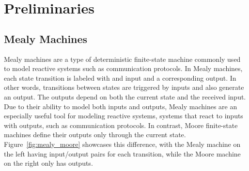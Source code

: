 %
%
% 

\chapter{Preliminaries}

\label{chap:Preliminaries}

\section{Mealy Machines}
Mealy machines are a type of deterministic finite-state machine commonly used to model reactive systems such as communication protocols. In Mealy machines, each state transition is labeled with and input and a corresponding output. In other words, transitions between states are triggered by inputs and also generate an output. The outputs depend on both the current state and the received input. Due to their ability to model both inputs and outputs, Mealy machines are an especially useful tool for modeling reactive systems, systems that react to inputs with outputs, such as communication protocols. In contrast, Moore finite-state machines define their outputs only through the current state. Figure~\ref{fig:mealy_moore} showcases this difference, with the Mealy machine on the left having input/output pairs for each transition, while the Moore machine on the right only has outputs. 

